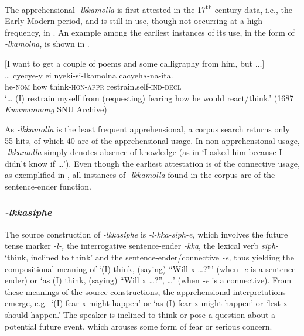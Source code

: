 \documentclass[output=paper,colorlinks,citecolor=brown]{langscibook}
\begin{document}
The apprehensional \textit{-lkkamolla} is first attested in the 17\textsuperscript{th} century data, i.e., the Early Modern  period, and is still in use, though not occurring at a high frequency, in . An example among the earliest instances of its use, in the form of \textit{-lkamolna}, is shown in .


\ea \label{ex:RK8} \textnormal{$[$I want to get a couple of poems and some calligraphy from him, but $\ldots]$} \\
\gll … cyecye-y ei nyeki-si-lkamolna cacyeh\textsc{a}-na-ita. \\
{} he-\textsc{nom} how think-\textsc{hon-appr} restrain.self-\textsc{ind-decl} \\
\glt `… (I) restrain myself from (requesting) fearing how he would react/think.' (1687 \textit{Kwuwunmong} SNU Archive)
\z


 As \textit{-lkkamolla} is the least frequent apprehensional, a corpus search returns only 55 hits, of which 40 are of the apprehensional usage. In non-apprehensional usage, \textit{-lkkamolla} simply denotes absence of knowledge (as in `I asked him because I didn't know if …').  Even though the earliest attestation is of the connective usage, as exemplified in , all instances of \textit{-lkkamolla} found in the corpus are of the sentence-ender function.

\subsubsection{\textit{-lkkasiphe}} 
The source construction of \textit{-lkkasiphe} is \textit{-l-kka-siph-e,} which involves the future tense marker \textit{-l-,} the interrogative sentence-ender \textit{-kka}, the lexical verb \textit{siph-} `think, inclined to think' and the sentence-ender/connective \textit{-e,} thus yielding the compositional meaning of `(I) think, (saying) ``Will x …?''' (when \textit{-e} is a sentence-ender) or `as (I) think, (saying) ``Will x …?'',  …' (when \textit{-e} is a connective). From these meanings of the source constructions, the apprehensional interpretations emerge, e.g.\  `(I) fear x might happen' or `as (I) fear x might happen' or `lest x should happen.' The speaker is inclined to think or pose a question about a potential future event, which arouses some form of fear or serious concern.
\end{document}
